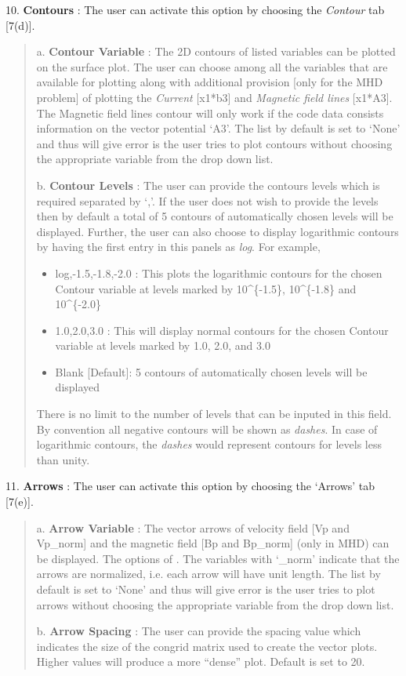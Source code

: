 \documentclass[letterpaper,10pt,english]{sphinxmanual}
\begin{document}
10. \textbf{Contours} : The user can activate this option by choosing the
\emph{Contour} tab {[}7(d){]}.
\begin{quote}

a. \textbf{Contour Variable} : The 2D contours of listed variables can be plotted on
the surface plot. The user can choose among all the variables
that are available for plotting along with additional provision
{[}only for the MHD problem{]} of plotting the \emph{Current}
{[}x1*b3{]} and \emph{Magnetic field lines} {[}x1*A3{]}. The Magnetic
field lines contour will only work if the code data consists
information on the vector potential `A3'.
The list by default is set to `None' and thus
will give error is the user tries to plot contours without
choosing the appropriate variable from the drop down list.

b. \textbf{Contour Levels} : The user can provide the contours levels which is required separated by `,'. If the user does not
wish to provide the levels then by default a total of 5 contours of automatically chosen levels will be displayed. Further, the
user can also choose to display logarithmic contours by having the
first entry in this panels as \emph{log}. For example,
\begin{itemize}
\item {} 
log,-1.5,-1.8,-2.0 : This plots the logarithmic contours for the chosen Contour variable at levels marked by 10\textasciicircum{}\{-1.5\}, 10\textasciicircum{}\{-1.8\} and 10\textasciicircum{}\{-2.0\}

\item {} 
1.0,2.0,3.0 : This will display normal contours for the chosen Contour variable at levels marked by 1.0, 2.0, and 3.0

\item {} 
Blank {[}Default{]}: 5 contours of automatically chosen  levels will be displayed

\end{itemize}

There is no limit to the number of levels that can be inputed in this
field. By convention all negative contours will be shown as
\emph{dashes}. In case of logarithmic contours, the \emph{dashes} would
represent contours for levels less than unity.
\end{quote}

11. \textbf{Arrows} : The user can activate this option by choosing the
`Arrows' tab {[}7(e){]}.
\begin{quote}

a. \textbf{Arrow Variable} : The vector arrows of velocity field {[}Vp and
Vp\_norm{]} and the magnetic field {[}Bp and Bp\_norm{]} (only in
MHD) can be displayed. The options of . The variables with `\_norm' indicate that the
arrows are normalized, i.e. each arrow will have unit length.
The list by default is set to `None' and thus
will give error is the user tries to plot arrows without
choosing the appropriate variable from the drop down list.

b. \textbf{Arrow Spacing} : The user can provide the spacing
value which indicates the size of the congrid matrix used to
create the vector plots. Higher values will produce a more
``dense'' plot. Default is set to 20.
\end{quote}
\end{document}
